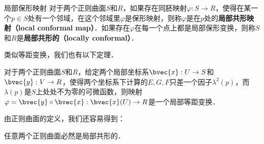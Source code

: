 \begin{definition}{局部保形映射}
对于两个正则曲面$S$和$R$，如果存在同胚映射$\varphi:S\to R$，使得在某一个$p\in S$处有一个邻域，在这个邻域里$\varphi$是保形映射，则称$\varphi$是在$p$处的\textbf{局部共形映射（local conformal map）}．如果存在$\varphi$在每一个点上都是局部保形变换，则称$S$和$R$是\textbf{局部共形的（locally conformal）}．
\end{definition}

类似等距变换，我们也有以下定理．

\begin{theorem}{}
对于两个正则曲面$S$和$R$，给定两个局部坐标系$\bvec{x}:U\to S$和$\bvec{y}:V\to R$，使得两个坐标系下计算的$E, G, F$只差一个因子$\lambda^2(p)$，而$\lambda(p)$是$S$上处处不为零的可微函数，则映射$\varphi=\bvec{y}\circ\bvec{x}:\bvec{x}(U)\to R$是一个局部等距变换．
\end{theorem}

由正则曲面的定义，我们还容易得到：

\begin{theorem}{}
任意两个正则曲面必然是局部共形的．
\end{theorem}



